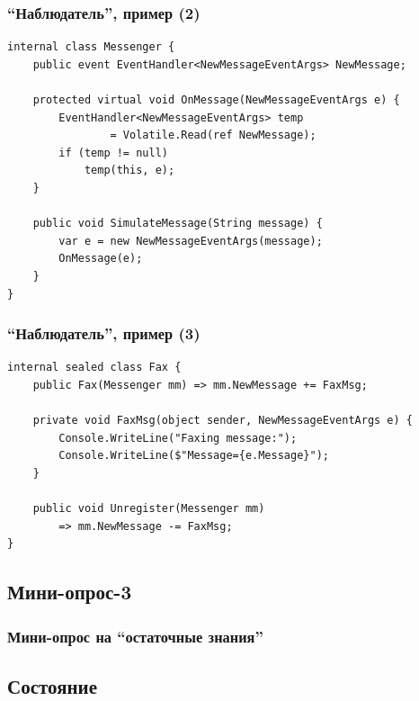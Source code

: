 \documentclass[xetex,mathserif,serif]{beamer}
\begin{document}
    \begin{frame}[fragile]
        \frametitle{``Наблюдатель'', пример (2)}
        \begin{small}
            \begin{verbatim}
internal class Messenger {
    public event EventHandler<NewMessageEventArgs> NewMessage;

    protected virtual void OnMessage(NewMessageEventArgs e) {
        EventHandler<NewMessageEventArgs> temp 
                = Volatile.Read(ref NewMessage);
        if (temp != null)
            temp(this, e);
    }

    public void SimulateMessage(String message) {
        var e = new NewMessageEventArgs(message);
        OnMessage(e);
    }
}
            \end{verbatim}
        \end{small}
    \end{frame}

    \begin{frame}[fragile]
        \frametitle{``Наблюдатель'', пример (3)}
        \begin{itemize}
            \begin{verbatim}
internal sealed class Fax {
    public Fax(Messenger mm) => mm.NewMessage += FaxMsg;

    private void FaxMsg(object sender, NewMessageEventArgs e) {
        Console.WriteLine("Faxing message:");
        Console.WriteLine($"Message={e.Message}");
    }

    public void Unregister(Messenger mm) 
        => mm.NewMessage -= FaxMsg;
}
            \end{verbatim}
        \end{itemize}
    \end{frame}

    \subsection{Мини-опрос-3}

    \begin{frame}
        \frametitle{Мини-опрос на ``остаточные знания''}
    \end{frame}

    \subsection{Состояние}
\end{document}
